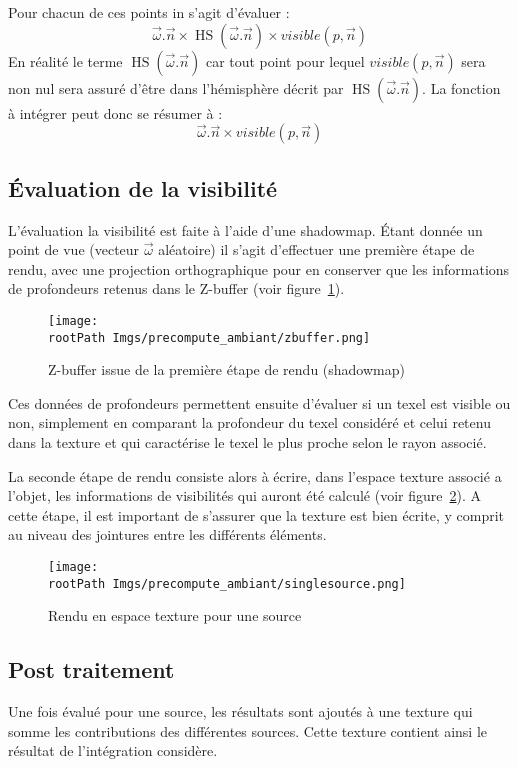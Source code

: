 \documentclass[10pt,a4paper,twoside, twocolumn]{report}
\newcommand*{\rootPath}{../}
\newcommand{\Hs}{\operatorname{HS}}
\begin{document}
Pour chacun de ces points in s’agit d'évaluer :
	$$\vec\omega.\vec n\times \Hs(\vec \omega.\vec n)\times visible(p, \vec n)$$
En réalité le terme $\Hs(\vec \omega.\vec n)$ car tout point pour lequel $visible(p, \vec n)$ sera non nul sera assuré d’être dans l’hémisphère décrit par $\Hs(\vec \omega.\vec n)$. La fonction à intégrer peut donc se résumer à :
	$$\vec\omega.\vec n\times visible(p, \vec n)$$

\subsection{Évaluation de la visibilité}
L'évaluation la visibilité est faite à l'aide d'une shadowmap. Étant donnée un point de vue (vecteur $\vec\omega$ aléatoire) il s’agit d’effectuer une première étape de rendu, avec une projection orthographique pour en conserver que les informations de profondeurs retenus dans le Z-buffer (voir figure~\ref{fig:precompute_ambiant:zbuffer}).

\begin{figure}[!ht]\centering
	\texttt{[image: \\rootPath Imgs/precompute\_ambiant/zbuffer.png]}
	\caption{Z-buffer issue de la première étape de rendu (shadowmap)}
	\label{fig:precompute_ambiant:zbuffer}
\end{figure}


Ces données de profondeurs permettent ensuite d'évaluer si un texel est visible ou non, simplement en comparant la profondeur du texel considéré et celui retenu dans la texture et qui caractérise le texel le plus proche selon le rayon associé.

La seconde étape de rendu consiste alors à écrire, dans l’espace texture associé a l'objet, les informations de visibilités qui auront été calculé (voir figure~\ref{fig:precompute_ambiant:singlesource}). A cette étape, il est important de s'assurer que la texture est bien écrite, y comprit au niveau des jointures entre les différents éléments.

\begin{figure}[!ht]\centering
	\texttt{[image: \\rootPath Imgs/precompute\_ambiant/singlesource.png]}
	\caption{Rendu en espace texture pour une source}
	\label{fig:precompute_ambiant:singlesource}
\end{figure}

\subsection{Post traitement}
Une fois évalué pour une source, les résultats sont ajoutés à une texture qui somme les contributions des différentes sources. Cette texture contient ainsi le résultat de l'intégration considère.
\end{document}
